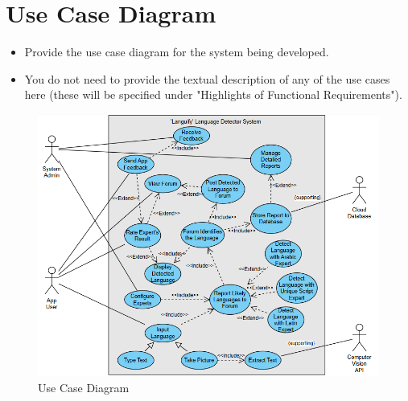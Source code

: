 \section{Use Case Diagram}
\label{sec:use_case_diagram}
\begin{itemize}
	\item Provide the use case diagram for the system being developed.
	\item You do not need to provide the textual description of any of the use cases here (these will be specified under "Highlights of Functional Requirements").
\end{itemize}


\begin{figure}
	\includegraphics[width=\linewidth]{Section3/UseCaseDiagram.png}
	\caption{Use Case Diagram}
	\label{UseCaseDiagram}
\end{figure}

%
%
%
